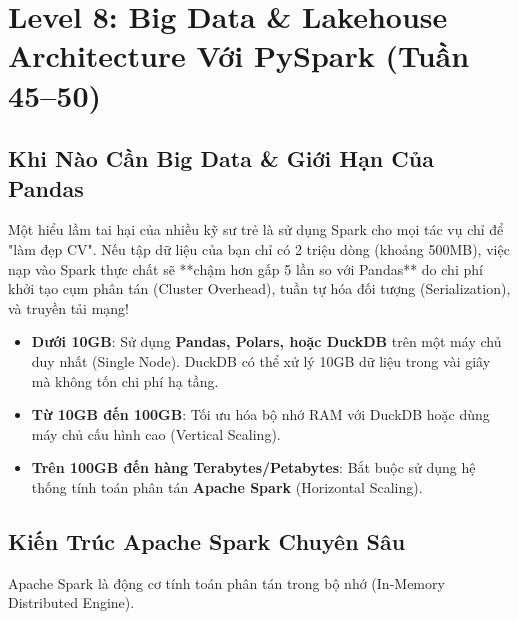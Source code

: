 \chapter{Level 8: Big Data \& Lakehouse Architecture Với PySpark (Tuần 45--50)}

\section{Khi Nào Cần Big Data \& Giới Hạn Của Pandas}

Một hiểu lầm tai hại của nhiều kỹ sư trẻ là sử dụng Spark cho mọi tác vụ chỉ để "làm đẹp CV". Nếu tập dữ liệu của bạn chỉ có 2 triệu dòng (khoảng 500MB), việc nạp vào Spark thực chất sẽ **chậm hơn gấp 5 lần so với Pandas** do chi phí khởi tạo cụm phân tán (Cluster Overhead), tuần tự hóa đối tượng (Serialization), và truyền tải mạng!

\begin{lythuyetbox}
\begin{itemize}
    \item \textbf{Dưới 10GB}: Sử dụng \textbf{Pandas, Polars, hoặc DuckDB} trên một máy chủ duy nhất (Single Node). DuckDB có thể xử lý 10GB dữ liệu trong vài giây mà không tốn chi phí hạ tầng.
    \item \textbf{Từ 10GB đến 100GB}: Tối ưu hóa bộ nhớ RAM với DuckDB hoặc dùng máy chủ cấu hình cao (Vertical Scaling).
    \item \textbf{Trên 100GB đến hàng Terabytes/Petabytes}: Bắt buộc sử dụng hệ thống tính toán phân tán \textbf{Apache Spark} (Horizontal Scaling).
\end{itemize}
\end{lythuyetbox}

\section{Kiến Trúc Apache Spark Chuyên Sâu}

Apache Spark là động cơ tính toán phân tán trong bộ nhớ (In-Memory Distributed Engine).


